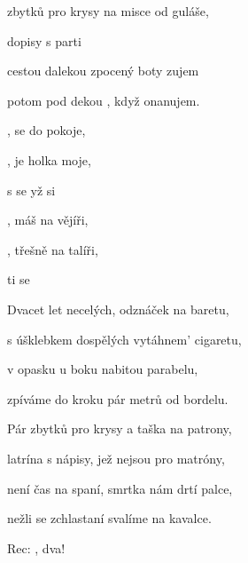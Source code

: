 

\zs
{} zbytků pro krysy na misce od guláše,

 dopisy s parti 

 cestou dalekou zpocený boty zujem

 potom pod dekou , když onanujem.
\ks

\zr
{},  se do pokoje,

,  je holka moje,

s  se yž  si  

,  máš na vějíři,

,  třešně na talíři,

 ti   se 
\kr

\zs
Dvacet let necelých, odznáček na baretu,

s úšklebkem dospělých vytáhnem' cigaretu,

v opasku u boku nabitou parabelu,

zpíváme do kroku pár metrů od bordelu.
\ks

\zr  \kr

\zs
Pár zbytků pro krysy a taška na patrony,

latrína s nápisy, jež nejsou pro matróny,

není čas na spaní, smrtka nám drtí palce,

nežli se zchlastaní svalíme na kavalce.
\ks

\zr  \kr

Rec: , dva!

\zr  \kr

\kp





